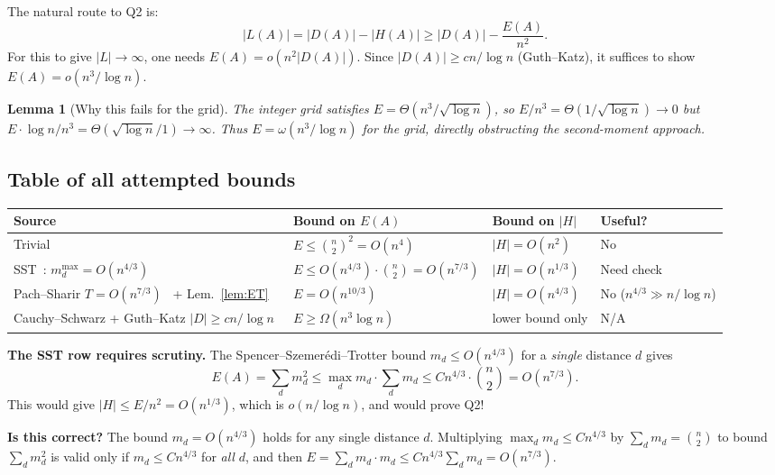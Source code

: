 \documentclass[12pt,a4paper]{amsart}
\def\cL{\textit{L}}\def\cH{\textit{H}}%
\theoremstyle{plain}
\newtheorem{lemma}[theorem]{Lemma}
\theoremstyle{definition}
\newcommand{\cL}{\mathcal{L}}
\newcommand{\cH}{\mathcal{H}}
\begin{document}
The natural route to Q2 is:
\[
  |\cL(A)| = |D(A)| - |\cH(A)| \ge |D(A)| - \frac{E(A)}{n^2}.
\]
For this to give $|\cL|\to\infty$, one needs $E(A)=o(n^2|D(A)|)$.
Since $|D(A)|\ge cn/\log n$ (Guth--Katz), it suffices to show
$E(A)=o(n^3/\log n)$.

\begin{lemma}[Why this fails for the grid]
The integer grid satisfies
$E=\Theta(n^3/\sqrt{\log n})$,
so $E/n^3 = \Theta(1/\sqrt{\log n})\to 0$ but
$E\cdot\log n/n^3 = \Theta(\sqrt{\log n}/1)\to\infty$.
Thus $E=\omega(n^3/\log n)$ for the grid, directly obstructing
the second-moment approach.
\end{lemma}

\subsection{Table of all attempted bounds}

\begin{center}
\begin{tabular}{llll}
\toprule
Source & Bound on $E(A)$ & Bound on $|\cH|$ & Useful? \\
\midrule
Trivial & $E\le\binom{n}{2}^2=O(n^4)$ & $|\cH|=O(n^2)$ & No \\
SST~\cite{SST84}: $m_d^{\max}=O(n^{4/3})$ &
  $E\le O(n^{4/3})\cdot\binom{n}{2}=O(n^{7/3})$ & $|\cH|=O(n^{1/3})$ &
  Need check \\
Pach--Sharir $T=O(n^{7/3})$~\cite{PS98} + Lem.~\ref{lem:ET} &
  $E=O(n^{10/3})$ & $|\cH|=O(n^{4/3})$ & No ($n^{4/3}\gg n/\log n$) \\
Cauchy--Schwarz + Guth--Katz $|D|\ge cn/\log n$~\cite{GK15} &
  $E\ge\Omega(n^3\log n)$ & lower bound only & N/A \\
\bottomrule
\end{tabular}
\end{center}

\medskip
\noindent\textbf{The SST row requires scrutiny.}
The Spencer--Szemer\'edi--Trotter bound $m_d\le O(n^{4/3})$ for a
\emph{single} distance $d$ gives
\[
  E(A)=\sum_d m_d^2 \le \max_d m_d \cdot \sum_d m_d
  \le C n^{4/3}\cdot\binom{n}{2} = O(n^{7/3}).
\]
This would give $|\cH|\le E/n^2=O(n^{1/3})$, which is
$o(n/\log n)$, and would prove Q2!

\textbf{Is this correct?}  The bound $m_d=O(n^{4/3})$ holds for
any single distance $d$.  Multiplying $\max_d m_d\le Cn^{4/3}$ by
$\sum_d m_d=\binom{n}{2}$ to bound $\sum_d m_d^2$ is valid only
if $m_d\le Cn^{4/3}$ for \emph{all} $d$, and then
$E=\sum_d m_d\cdot m_d\le Cn^{4/3}\sum_d m_d=O(n^{7/3})$.
\end{document}
